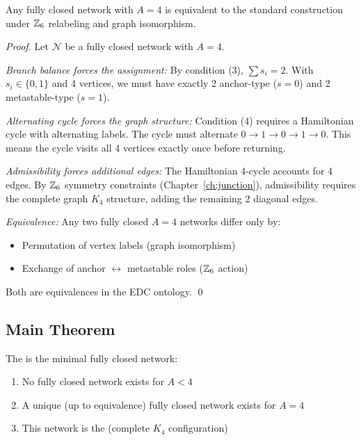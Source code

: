 \begin{lemma} \tagDer
    \label{lem:closed-4-unique}
    Any fully closed network with $A = 4$ is equivalent to the standard
    \ClosedFour{} construction under $\mathbb{Z}_6$ relabeling and graph isomorphism.
\end{lemma}

\begin{proof}
    Let $\mathcal{N}$ be a fully closed network with $A = 4$.

    \emph{Branch balance forces the assignment:} By condition (3),
    $\sum s_i = 2$. With $s_i \in \{0, 1\}$ and 4 vertices, we must have
    exactly 2 anchor-type ($s = 0$) and 2 metastable-type ($s = 1$).

    \emph{Alternating cycle forces the graph structure:} Condition (4)
    requires a Hamiltonian cycle with alternating labels. The cycle must
    alternate $0 \to 1 \to 0 \to 1 \to 0$. This means the cycle visits all
    4 vertices exactly once before returning.

    \emph{Admissibility forces additional edges:} The Hamiltonian 4-cycle
    accounts for 4 edges. By $\mathbb{Z}_6$ symmetry constraints (Chapter~\ref{ch:junction}),
    admissibility requires the complete graph $K_4$ structure, adding the
    remaining 2 diagonal edges.

    \emph{Equivalence:} Any two fully closed $A = 4$ networks differ only by:
    \begin{itemize}
        \item Permutation of vertex labels (graph isomorphism)
        \item Exchange of anchor $\leftrightarrow$ metastable roles ($\mathbb{Z}_6$ action)
    \end{itemize}

    Both are equivalences in the EDC ontology. \qed
\end{proof}

\subsection{Main Theorem}
\label{sec:he4:min:theorem}

\begin{theorem} \tagDer
    \label{thm:closed-4-minimal}
    The \ClosedFour{} is the minimal fully closed \Junction{} network:
    \begin{enumerate}
        \item No fully closed network exists for $A < 4$
        \item A unique (up to equivalence) fully closed network exists for $A = 4$
        \item This network is the \ClosedFour{} (complete $K_4$ configuration)
    \end{enumerate}
\end{theorem}

